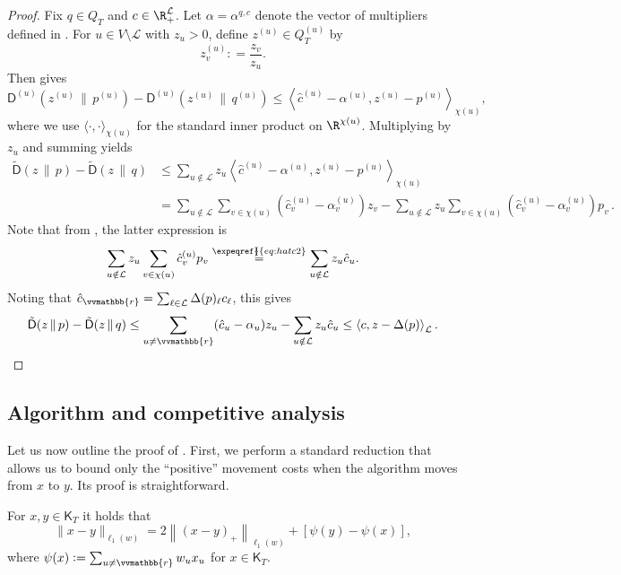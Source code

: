 \documentclass{toc}
\newcommand{\calL}{\mathcal L}
\newcommand{\dmid}{\,\|\,}
\newcommand{\vvr}{\vvmathbb{r}}
\newcommand{\seteq}{\mathrel{\mathop:}=}
\newcommand{\sfD}{\mathsf D}
\newcommand{\sfK}{\mathsf K}
\newcommand{\tilD}{\tilde{\sfD}}
\newcommand{\llangle}{\left\langle}
\newcommand{\rrangle}{\right\rangle}
\begin{document}
\begin{proof}
	Fix $q \in Q_T$ and $c \in \R_+^{\calL}$.
	Let $\alpha = \alpha^{q,c}$ denote the vector of multipliers
	defined in .
	For $u \in V \setminus \calL$ with $z_u > 0$, define $z^{(u)} \in Q^{(u)}_T$ by
	\[
	z^{(u)}_v \seteq \frac{z_v}{z_u}. 
	\]
	Then  gives
	\[
	\sfD^{(u)}\left(z^{(u)} \dmid p^{(u)}\right) - \sfD^{(u)}\left(z^{(u)} \dmid q^{(u)}\right) \leq \llangle \hat{c}^{(u)} - \alpha^{(u)}, 
	z^{(u)} - p^{(u)}\rrangle_{\chi(u)},
	\]
	where we use $\langle \cdot,\cdot\rangle_{\chi(u)}$ for the standard inner product on $\R^{\chi(u)}$.
	Multiplying by $z_u$ and summing yields
	\begin{align*}
	\tilD(z \dmid p) - \tilD(z \dmid q) &\leq \sum_{u \notin \calL} z_u \llangle \hat{c}^{(u)} - \alpha^{(u)}, z^{(u)} - p^{(u)} \rrangle_{\chi(u)} \\
	&= \sum_{u \notin \calL} \sum_{v \in \chi(u)} (\hat{c}^{(u)}_v -\alpha^{(u)}_v) z_v - \sum_{u \notin \calL} z_u \sum_{v \in \chi(u)} (\hat{c}^{(u)}_v-\alpha^{(u)}_v) p_v\,.
	\end{align*}
	Note that from , the latter expression is
	\[
	\sum_{u \notin \calL} z_u \sum_{v \in \chi(u)} \hat{c}_v^{(u)} p_v
	\stackrel{\expeqref{\!\!\!}{eq:hatc2}}{=}\sum_{u \notin \calL} z_u \hat{c}_u.
	\]
	Noting that $\hat{c}_{\vvr} = \sum_{\ell \in \calL} \Delta(p)_{\ell} c_{\ell}$,  this gives
	\[
	\tilD(z \dmid p) - \tilD(z \dmid q) \leq \sum_{u \neq \vvr} (\hat{c}_u - \alpha_u) z_u - \sum_{u \notin \calL} z_u \hat{c}_u
	\leq \llangle c, z-\Delta(p)\rrangle_{\calL}. \qedhere
	\]
\end{proof}


\subsection{Algorithm and competitive analysis}
\label{sec:alg}

Let us now outline the proof of .
First, we perform a standard reduction that allows us to
bound only the ``positive'' movement costs when the algorithm
moves from $x$ to $y$.
Its proof is straightforward.

\begin{lemma}\label{lem:height}
	For $x,y\in \sfK_T$ it holds that
	\[
	\|x-y\|_{\ell_1(w)} = 2 \left\|(x-y)_{+}\right\|_{\ell_1(w)} + [\psi(y)-\psi(x)],
	\]
   where $\psi(x) \seteq \sum_{u \neq \vvr} w_u x_u$ for $x \in \sfK_T$.
\end{lemma}
\end{document}
